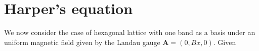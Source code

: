 \documentclass{report}
\begin{document}
\chapter{Harper's equation} \label{appendix b}
%
We now consider the case of hexagonal lattice with one band as a basis under an uniform magnetic field given by the Landau gauge $\mathbf{A} = (0, Bx,0)$. Given
\end{document}
